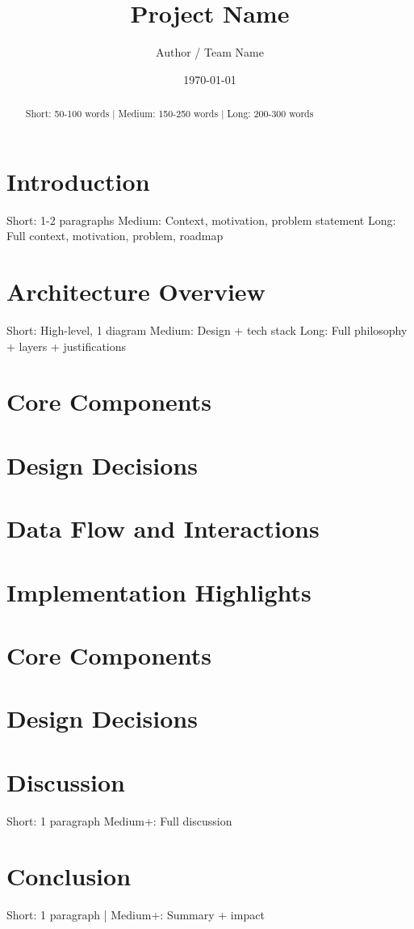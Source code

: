 \documentclass[11pt,a4paper]{article}
\title{{Project Name}}
\author{{Author / Team Name}}
\date{\today}
\begin{document}
\maketitle

\begin{abstract}
{Short: 50-100 words | Medium: 150-250 words | Long: 200-300 words}
\end{abstract}

\section{Introduction}
{Short: 1-2 paragraphs}
{Medium: Context, motivation, problem statement}
{Long: Full context, motivation, problem, roadmap}

\section{Architecture Overview}
{Short: High-level, 1 diagram}
{Medium: Design + tech stack}
{Long: Full philosophy + layers + justifications}

\iflong
\section{Core Components}
\section{Design Decisions}
\section{Data Flow and Interactions}
\section{Implementation Highlights}
\fi

\iflong\else\ifmedium
\section{Core Components}
\section{Design Decisions}
\fi\fi

\section{Discussion}
{Short: 1 paragraph}
{Medium+: Full discussion}

\section{Conclusion}
{Short: 1 paragraph | Medium+: Summary + impact}

\iflong\else\ifmedium
\nocite{*}


\fi\fi
\end{document}
